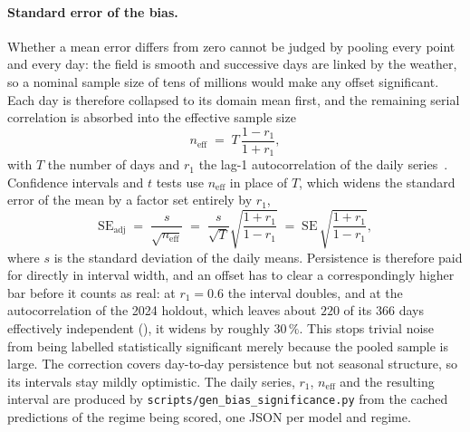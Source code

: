\paragraph*{Standard error of the bias.}
Whether a mean error differs from zero cannot be judged by pooling every point and every day: the field is smooth and successive days are linked by the weather, so a nominal sample size of tens of millions would make any offset significant. Each day is therefore collapsed to its domain mean first, and the remaining serial correlation is absorbed into the effective sample size
\begin{equation}
    n_{\mathrm{eff}} \;=\; T \, \frac{1 - r_{1}}{1 + r_{1}} ,
    \label{eq:neff}
\end{equation}
with $T$ the number of days and $r_1$ the lag-1 autocorrelation of the daily series~\cite{wilks2019statistical}. Confidence intervals and $t$ tests use $n_{\mathrm{eff}}$ in place of $T$, which widens the standard error of the mean by a factor set entirely by $r_1$,
\begin{equation}
    \mathrm{SE}_{\mathrm{adj}} \;=\; \frac{s}{\sqrt{n_{\mathrm{eff}}}}
    \;=\; \frac{s}{\sqrt{T}} \sqrt{\frac{1 + r_1}{1 - r_1}}
    \;=\; \mathrm{SE} \, \sqrt{\frac{1 + r_1}{1 - r_1}} ,
    \label{eq:se-adj}
\end{equation}
where $s$ is the standard deviation of the daily means. Persistence is therefore paid for directly in interval width, and an offset has to clear a correspondingly higher bar before it counts as real: at $r_1 = 0.6$ the interval doubles, and at the autocorrelation of the 2024 holdout, which leaves about $220$ of its $366$ days effectively independent (), it widens by roughly $30\,\%$. This stops trivial noise from being labelled statistically significant merely because the pooled sample is large. The correction covers day-to-day persistence but not seasonal structure, so its intervals stay mildly optimistic. The daily series, $r_1$, $n_{\mathrm{eff}}$ and the resulting interval are produced by \texttt{scripts/gen\_bias\_significance.py} from the cached predictions of the regime being scored, one JSON per model and regime.

